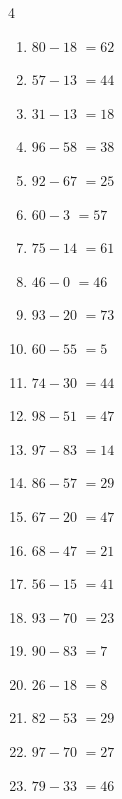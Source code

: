 \begin{multicols}{4}
\begin{enumerate}
  \item $80-18$
        $=62$

  \item $57-13$
        $=44$

  \item $31-13$
        $=18$

  \item $96-58$
        $=38$

  \item $92-67$
        $=25$

  \item $60-3$
        $=57$

  \item $75-14$
        $=61$

  \item $46-0$
        $=46$

\columnbreak %

  \item $93-20$
        $=73$

  \item $60-55$
        $=5$

  \item $74-30$
        $=44$

  \item $98-51$
        $=47$

  \item $97-83$
        $=14$

  \item $86-57$
        $=29$

  \item $67-20$
        $=47$

  \item $68-47$
        $=21$

  \item $56-15$
        $=41$

  \item $93-70$
        $=23$

  \item $90-83$
        $=7$

  \item $26-18$
        $=8$

  \item $82-53$
        $=29$

  \item $97-70$
        $=27$

  \item $79-33$
        $=46$


\end{enumerate}
\end{multicols}
